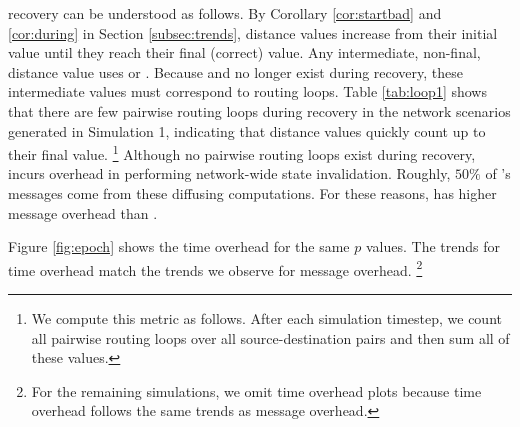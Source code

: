 
\second recovery can be understood as follows.  By Corollary \ref{cor:startbad} and \ref{cor:during} in Section \ref{subsec:trends}, distance values increase from their initial value until they 
reach their final (correct) value. Any intermediate, non-final, distance value uses \badvector or \oldvectors. Because \badvector and \oldvector no longer exist during recovery,
these intermediate values must correspond to routing loops.
Table \ref{tab:loop1} shows that there are few pairwise routing loops during \second recovery in the network scenarios generated in Simulation 1, 
indicating that \second distance values quickly count up to their final value.
{\footnote {\small We compute this metric as follows. After each simulation timestep, we count all pairwise routing loops over all source-destination pairs and then sum all of these values.}}
Although no pairwise routing loops exist during \purge recovery, \purge incurs overhead in performing network-wide state invalidation. Roughly, $50\%$ of \purges's messages come from these
diffusing computations. 
For these reasons, \purge has higher message overhead than \seconds.

Figure \ref{fig:epoch} shows the time overhead for the same $p$ values. The trends for time overhead match the trends we observe for message overhead. 
{\footnote {\small For the remaining simulations, we omit time overhead plots because time overhead follows the same trends as message overhead.}}


